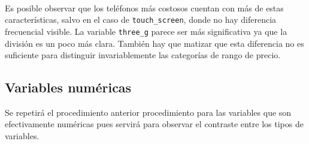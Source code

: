 \documentclass[12pt,a4paper,table]{article}
\begin{document}
    \begin{center}
    \end{center}
    { \hspace*{\fill} \\}
    
    Es posible observar que los teléfonos más costosos cuentan con más de
estas características, salvo en el caso de \texttt{touch\_screen}, donde
no hay diferencia frecuencial visible. La variable \texttt{three\_g}
parece ser más significativa ya que la división es un poco más clara.
También hay que matizar que esta diferencia no es suficiente para
distinguir invariablemente las categorías de rango de precio.

\hypertarget{variables-numuxe9ricas}{%
\subsection{Variables numéricas}\label{variables-numuxe9ricas}}

Se repetirá el procedimiento anterior procedimiento para las variables
que son efectivamente numéricas pues servirá para observar el contraste
entre los tipos de variables.
\end{document}
